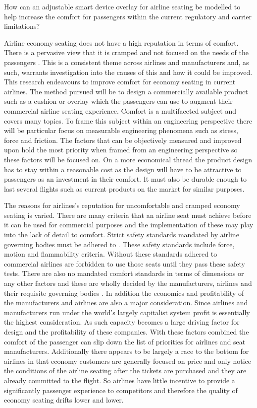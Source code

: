 \documentclass[conference]{IEEEtran}
\begin{document}
How can an adjustable smart device overlay for airline seating be modelled to help increase the comfort for passengers within the current regulatory and carrier limitations?

Airline economy seating does not have a high reputation in terms of comfort. There is a pervasive view that it is cramped and not focused on the needs of the passengers \cite{SKYTRAXOnline2014}. This is a consistent theme across airlines and manufacturers and, as such, warrants investigation into the causes of this and how it could be improved. This research endeavours to improve comfort for economy seating in current airlines. The method pursued will be to design a commercially available product such as a cushion or overlay which the passengers can use to augment their commercial airline seating experience. Comfort is a multifaceted subject and covers many topics. To frame this subject within an engineering perspective there will be particular focus on measurable engineering phenomena such as stress, force and friction. The factors that can be objectively measured and improved upon hold the most priority when framed from an engineering perspective so these factors will be focused on. On a more economical thread the product design has to stay within a reasonable cost as the design will have to be attractive to passengers as an investment in their comfort. It must also be durable enough to last several flights such as current products on the market for similar purposes.

The reasons for airlines's reputation for uncomfortable and cramped economy seating is varied. There are many criteria that an airline seat must achieve before it can be used for commercial purposes and the implementation of these may play into the lack of detail to comfort. Strict safety standards mandated by airline governing bodies must be adhered to \cite{CornellLaw}. These safety standards include force, motion and flammability criteria. Without these standards adhered to commercial airlines are forbidden to use those seats until they pass these safety tests. There are also no mandated comfort standards in terms of dimensions or any other factors and these are wholly decided by the manufacturers, airlines and their requisite governing bodies \cite{CASA}. In addition the economics and profitability of the manufacturers and airlines are also a major consideration. Since airlines and manufacturers run under the world's largely capitalist system profit is essentially the highest consideration. As such capacity becomes a large driving factor for design and the profitability of these companies. With these factors combined the comfort of the passenger can slip down the list of priorities for airlines and seat manufacturers. Additionally there appears to be largely a race to the bottom for airlines in that economy customers are generally focused on price and only notice the conditions of the airline seating after the tickets are purchased and they are already committed to the flight. So airlines have little incentive to provide a significantly passenger experience to competitors and therefore the quality of economy seating drifts lower and lower.
\end{document}
